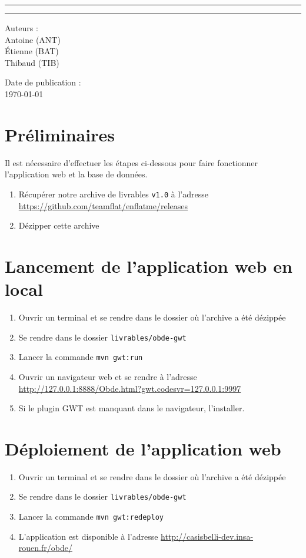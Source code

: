 \documentclass[a4paper, 12pt, french]{article}
\begin{document}
	\begin{center}
	    \rule{\linewidth}{1pt}
		\LARGE{}
	    \rule{\linewidth}{1pt} \newline{} \newline{}
	\end{center}
	\begin{center}
	    \large{Auteurs :}\\ Antoine  (ANT)\\ Étienne  (BAT) \\ Thibaud  (TIB)
	\end{center}
	\vspace{20px}
	\begin{center}
		\large{Date de publication :}\\ \today
	\end{center}

	\section{Préliminaires}
	Il est nécessaire d'effectuer les étapes ci-dessous pour faire fonctionner l'application web et la base de données.
	\begin{enumerate}
		\item Récupérer notre archive de livrables \texttt{v1.0} à l'adresse \url{https://github.com/teamflat/enflatme/releases}
		\item Dézipper cette archive
	\end{enumerate}

	\section{Lancement de l'application web en local}
	\begin{enumerate}
		\item Ouvrir un terminal et se rendre dans le dossier où l'archive a été dézippée
		\item Se rendre dans le dossier \texttt{livrables/obde-gwt}
		\item Lancer la commande \texttt{mvn gwt:run}
		\item Ouvrir un navigateur web et se rendre à l'adresse \url{http://127.0.0.1:8888/Obde.html?gwt.codesvr=127.0.0.1:9997}
		\item Si le plugin GWT est manquant dans le navigateur, l'installer.
	\end{enumerate}

	\section{Déploiement de l'application web}
	\begin{enumerate}
		\item Ouvrir un terminal et se rendre dans le dossier où l'archive a été dézippée
		\item Se rendre dans le dossier \texttt{livrables/obde-gwt}
		\item Lancer la commande \texttt{mvn gwt:redeploy}
		\item L'application est disponible à l'adresse \url{http://casisbelli-dev.insa-rouen.fr/obde/}
	\end{enumerate}
\end{document}
